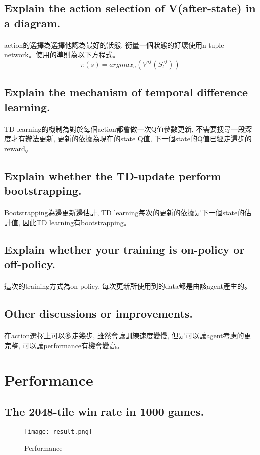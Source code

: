 \subsection{Explain the action selection of V(after-state) in a diagram.}
\paragraph{}
action的選擇為選擇他認為最好的狀態, 衡量一個狀態的好壞使用n-tuple network。使用的準則為以下方程式。
$$\pi(s) = argmax_a(V^{af}(S_t^{af}))$$
\subsection{Explain the mechanism of temporal difference learning.}
\paragraph{}
TD learning的機制為對於每個action都會做一次Q值參數更新, 不需要搜尋一段深度才有辦法更新, 更新的依據為現在的state Q值, 下一個state的Q值已經走這步的reward。
\subsection{Explain whether the TD-update perform bootstrapping.}
\paragraph{}
Bootstrapping為邊更新邊估計, TD learning每次的更新的依據是下一個state的估計值, 因此TD learning有bootstrapping。
\subsection{Explain whether your training is on-policy or off-policy.}
\paragraph{}
這次的training方式為on-policy, 每次更新所使用到的data都是由該agent產生的。
\subsection{Other discussions or improvements.}
\paragraph{}
在action選擇上可以多走幾步, 雖然會讓訓練速度變慢, 但是可以讓agent考慮的更完整, 可以讓performance有機會變高。
\newpage
\section{Performance}
\subsection{The 2048-tile win rate in 1000 games.}
\begin{figure}[!ht]
    \begin{center}
        \texttt{[image: result.png]}
        \caption{Performance}
    \end{center}
\end{figure}
